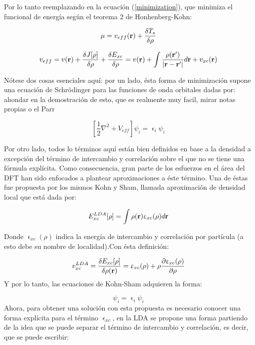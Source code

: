 \documentclass [11pt]{article}
\begin{document}
Por lo tanto reemplazando en la ecuación (\ref{minimization}), que  minimiza el funcional de energía según el teorema 2 de Honhenberg-Kohn:

\begin{equation}
	\mu=v_{eff}({\bf r})+\frac{\delta T_s}{\delta \rho}
\end{equation}

\begin{equation}
	v_{eff}=v({\bf r})+\frac{\delta J[\rho]}{\delta \rho}+\frac{\delta E_{xc}}{\delta \rho}=v({\bf r})+\int\frac{\rho({\bf r'})}{|{\bf r-r'}|}d{\bf r}+v_{xc}(\bf r)
\end{equation}

Nótese dos cosas esenciales aquí: por un lado, ésta forma de minimización supone una ecuación de Schrödinger para las funciones de onda orbitales dadas por:{\color{magenta} ahondar en la demostración de esto, que es realmente muy facil, mirar notas propias o el Parr} 

\begin{equation}
	\left[\frac{1}{2}\nabla^2+V_{eff}\right]\psi_i=\upvarepsilon_i \psi_i
\end{equation}

Por otro lado, todos lo términos aquí están bien definidos en base a la densidad a excepción del término de intercambio y correlación sobre el que no se tiene una fórmula explícita. Como consecuencia, gran parte de los esfuerzos en el área del DFT han sido enfocados a plantear aproximaciones a éste término. Una de éstas fue propuesta por los mismos Kohn y Sham, llamada aproximación de densidad local que está dada por:

\begin{equation}
	E_{xc}^{LDA}[\rho]=\int \rho({\bf r})\upvarepsilon_{xc}(\rho)d{\bf r}
\end{equation}

Donde $\upvarepsilon_{xc}(\rho)$ indica la energía de intercambio y correlación por partícula (a esto debe su nombre de localidad).Con ésta definición:

\begin{equation}
    v_{xc}^{LDA}=\frac{\delta E_{xc}[\rho]}{\delta \rho({\bf r})}=\upvarepsilon_{xc}(\rho)+\rho\frac{\partial \upvarepsilon_{xc}(\rho)}{\partial \rho}
\end{equation}
Y por lo tanto, las ecuaciones de Kohn-Sham adquieren la forma:

\begin{equation}
    [-\frac{1}{2}\nabla^2+v({\bf r})+\int \frac{\rho({\bf r'})}{|{\bf r}-{\bf r'}}d{\bf r'}+ v_{xc}^{LDA}]\psi_i=\upvarepsilon_i \psi_i
\end{equation}
Ahora, para obtener una solución con esta propuesta es necesario conocer una forma explícita para el término $\upvarepsilon_{xc}$, en la LDA se propone una forma partiendo de la idea que se puede separar el término de intercambio y correlación, es decir, que se puede escribir:
\end{document}

